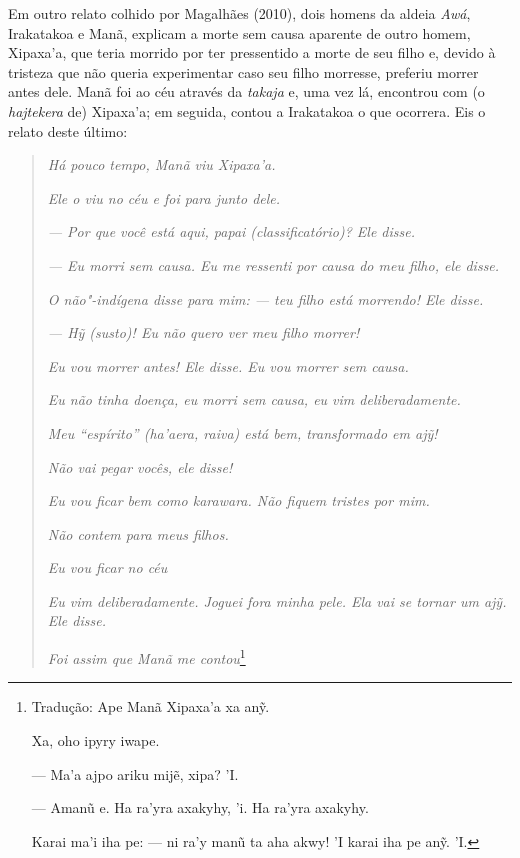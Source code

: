Em outro relato colhido por Magalhães (2010), dois homens da aldeia
\emph{Awá}, Irakatakoa e Manã, explicam a morte sem causa aparente de
outro homem, Xipaxa'a, que teria morrido por ter pressentido a morte de
seu filho e, devido à tristeza que não queria experimentar caso seu
filho morresse, preferiu morrer antes dele. Manã foi ao céu através da
\emph{takaja} e, uma vez lá, encontrou com (o \emph{hajtekera} de)
Xipaxa'a; em seguida, contou a Irakatakoa o que ocorrera. Eis o relato
deste último:

\begin{quote}
\emph{Há pouco tempo, Manã viu Xipaxa'a.}

\noindent\emph{Ele o viu no céu e foi para junto dele.}

\noindent\emph{--- Por que você está aqui, papai (classificatório)? Ele disse.}

\noindent\emph{--- Eu morri sem causa. Eu me ressenti por causa do meu filho, ele disse.}

\noindent\emph{O não"-indígena disse para mim: --- teu filho está morrendo! Ele disse.}

\noindent\emph{--- \emph{Hy}̃ (susto)! Eu não quero ver meu filho morrer!}

\noindent\emph{Eu vou morrer antes! Ele disse. Eu vou morrer sem causa.}

\noindent\emph{Eu não tinha doença, eu morri sem causa, eu vim deliberadamente.}

\noindent\emph{Meu ``espírito'' (\emph{ha'aera}, \emph{raiva}) está bem, transformado em
ajỹ!}

\noindent\emph{Não vai pegar vocês, ele disse!}

\noindent\emph{Eu vou ficar bem como \emph{karawara}. Não fiquem tristes por mim.}

\noindent\emph{Não contem para meus filhos.}

\noindent\emph{Eu vou ficar no céu}

\noindent\emph{Eu vim deliberadamente. Joguei fora minha pele. Ela vai se tornar um
\noindent\emph{ajỹ}. Ele disse.}

\noindent\emph{Foi assim que Manã me contou}\footnote{Tradução: Ape Manã Xipaxa'a xa
  anỹ.

  Xa, oho ipyry iwape.

  --- Ma'a ajpo ariku mijẽ, xipa? 'I.

  --- Amanũ e. Ha ra'yra axakyhy, 'i. Ha ra'yra axakyhy.

  Karai ma'i iha pe: --- ni ra'y manũ ta aha akwy! 'I karai iha pe anỹ.
  'I.

}
\end{quote}
